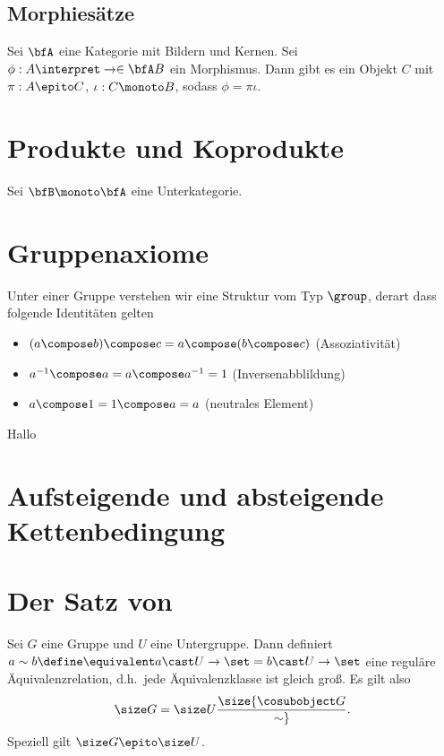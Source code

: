 \subsection{Morphiesätze}

\begin{theorem}
    Sei $\bfA$ eine Kategorie mit Bildern und Kernen. Sei $\phi:A\interpret\to\in\bfA B$ ein Morphismus. Dann gibt es ein Objekt
    $C$ mit $\pi:A\epito C$, $\iota:C\monoto B$, sodass $\phi = \pi\iota$. 
\end{theorem}


\section{Produkte und Koprodukte}

Sei $\bfB\monoto\bfA$ eine Unterkategorie. 


\section{Gruppenaxiome}

Unter einer Gruppe verstehen wir eine Struktur vom Typ $\group$, derart dass folgende Identitäten gelten
\begin{itemize}
        \item $(a\compose b)\compose c = a\compose (b\compose c)$ (Assoziativität)
        \item $a^{-1}\compose a = a\compose a^{-1} = 1$ (Inversenabblildung)
    \item $a\compose 1 = 1\compose a = a$ (neutrales Element)
\end{itemize}

\begin{theorem}
    Hallo
\end{theorem}

\section{Aufsteigende und absteigende Kettenbedingung}

\section{Der Satz von }

\begin{theorem}
    Sei $G$ eine Gruppe und $U$ eine Untergruppe. Dann definiert
    $
    a\sim b
    \define\equivalent
    a\cast U\to\set = b\cast U\to\set
    $
    eine reguläre Äquivalenzrelation, d.h.~jede Äquivalenzklasse ist gleich groß.
    Es gilt also
    $$
    \size G = \size U \size {\cosubobject G\over \sim}.
    $$
    Speziell gilt $\size G \epito \size U$. 
\end{theorem}

